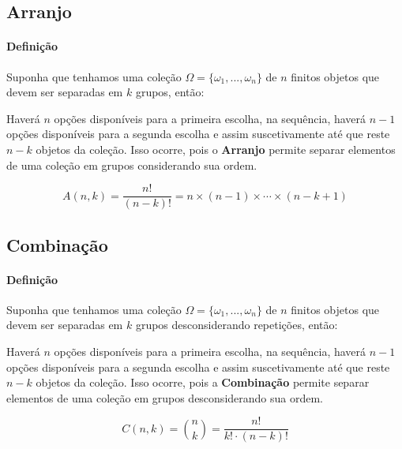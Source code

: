 \documentclass{article}
\begin{document}
        \subsection{Arranjo}
            \paragraph{Definição}Suponha que tenhamos uma coleção $\Omega = \{ \omega_{1}, ..., \omega_{n} \}$ de $n$ finitos objetos que devem ser separadas em $k$ grupos, então:
                \begin{displayquote}[][]
                    Haverá $n$ opções disponíveis para a primeira escolha, na sequência, haverá $n-1$ opções disponíveis para a segunda escolha e assim suscetivamente até que reste $n-k$ objetos da coleção. Isso ocorre, pois o \textbf{Arranjo} permite separar elementos de uma coleção em grupos considerando sua ordem.
                \end{displayquote}
                \begin{equation}
                    \boxed{
                        A(n, k) = \frac{n!}{(n - k)!} = n \times (n - 1) \times \cdots \times (n - k + 1)
                    }
                \end{equation}

        \subsection{Combinação}
            \paragraph{Definição}Suponha que tenhamos uma coleção $\Omega = \{ \omega_{1}, ..., \omega_{n} \}$ de $n$ finitos objetos que devem ser separadas em $k$ grupos desconsiderando repetições, então:
                \begin{displayquote}[][]
                    Haverá $n$ opções disponíveis para a primeira escolha, na sequência, haverá $n-1$ opções disponíveis para a segunda escolha e assim suscetivamente até que reste $n-k$ objetos da coleção. Isso ocorre, pois a \textbf{Combinação} permite separar elementos de uma coleção em grupos desconsiderando sua ordem.
                \end{displayquote}
                \begin{equation}
                    \boxed{
                        C(n, k) = \binom{n}{k} = \frac{n!}{k! \cdot (n - k)!}
                    }
                \end{equation}
\end{document}
